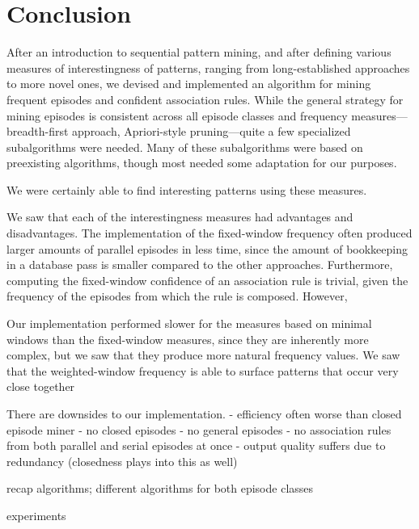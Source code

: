 \chapter{Conclusion}


After an introduction to sequential pattern mining, and after defining various measures of interestingness of patterns, ranging from long-established approaches to more novel ones, we devised and implemented an algorithm for mining frequent episodes and confident association rules. While the general strategy for mining episodes is consistent across all episode classes and frequency measures---breadth-first approach, Apriori-style pruning---quite a few specialized subalgorithms were needed. Many of these subalgorithms were based on preexisting algorithms, though most needed some adaptation for our purposes.


We were certainly able to find interesting patterns using these measures.

We saw that each of the interestingness measures had advantages and disadvantages. The implementation of the fixed-window frequency often produced larger amounts of parallel episodes in less time, since the amount of bookkeeping in a database pass is smaller compared to the other approaches. Furthermore, computing the fixed-window confidence of an association rule is trivial, given the frequency of the episodes from which the rule is composed. However, 

Our implementation performed slower for the measures based on minimal windows than the fixed-window measures, since they are inherently more complex, but we saw that they produce more natural frequency values. We saw that the weighted-window frequency is able to surface patterns that occur very close together


There are downsides to our implementation.
- efficiency often worse than closed episode miner
- no closed episodes
- no general episodes
- no association rules from both parallel and serial episodes at once
- output quality suffers due to redundancy (closedness plays into this as well)

recap algorithms; different algorithms for both episode classes

experiments

